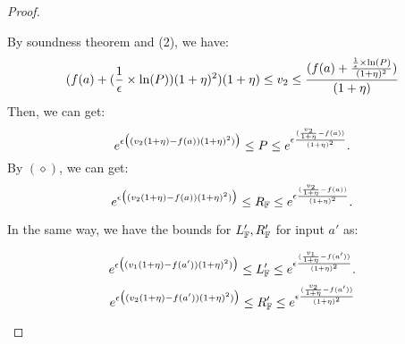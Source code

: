 \documentclass[a4paper,11pt]{article}
\begin{document}
\begin{proof}
\begin{itemize}
{	
}
%
%
		By soundness theorem and (2), we have:
		\[
		(f(a) + 
				(\frac{1}{\epsilon} \times \ln(P))
				(1 + \eta)^2)
				{(1 + \eta)}
		\leq v_2 \leq
			\frac{(
				f(a) + \frac{\frac{1}{\epsilon} 
				\times \ln(P)}
				{(1 + \eta)^2}
				)}
				{(1 + \eta)}		
		\]
		Then, we can get:
		\\ 
		$$
		e^{\epsilon 
		\big( (v_2(1 + \eta) - f(a)) (1 + \eta)^2) \big)}
		\leq
		P
		\leq
		e^{\epsilon 
		\frac{(\frac{v_2}{1 + \eta} - f(a))}{(1 + \eta)^2}}.$$
		By $(\diamond)$, we can get:
		\\ 
		$$
		e^{\epsilon 
		\big( (v_2(1 + \eta) - f(a)) (1 + \eta)^2) \big)}
		\leq
		R_{\mathbb{F}}
		\leq
		e^{\epsilon 
		\frac{(\frac{v_2}{1 + \eta} - f(a))}{(1 + \eta)^2}}.$$		

		In the same way, we have the bounds for $L_{\mathbb{F}}', R_{\mathbb{F}}'$ for input $a'$ as:

		$$e^{\epsilon 
				\big( (v_1(1 + \eta) - f(a')) (1 + \eta)^2) \big)}
		\leq L_{\mathbb{F}}' \leq
		e^{\epsilon 
				\frac{(\frac{v_1}{1 + \eta} - f(a'))}{(1 + \eta)^2}}.$$
		$$ 
		e^{\epsilon 
				\big( (v_2(1 + \eta) - f(a')) (1 + \eta)^2) \big)}
		\leq R_{\mathbb{F}}' \leq
		e^{\epsilon 
				\frac{(\frac{v_2}{1 + \eta} - f(a'))}{(1 + \eta)^2}}$$


\end{itemize}
\end{proof}
\end{document}
